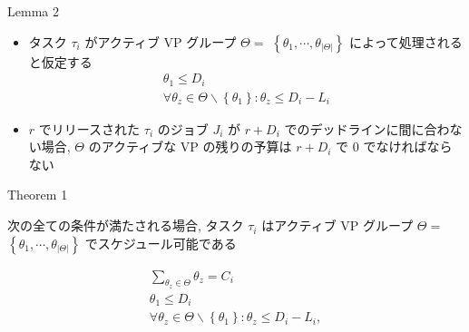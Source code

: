 \begin{frame}[label=lemma2]{Lemma 2}
    \begin{lemma}[]
        \begin{itemize}
            \item タスク $\tau_{i}$ がアクティブ VP グループ $\Theta=$  $\left\{\theta_{1}, \cdots, \theta_{|\Theta|}\right\}$ によって処理されると仮定する
                  \begin{equation*}
                      \begin{gathered}
                          \theta_{1} \leq D_{i} \\
                          \forall \theta_{z} \in \Theta \backslash\left\{\theta_{1}\right\}: \theta_{z} \leq D_{i}-L_{i}
                      \end{gathered}
                  \end{equation*}
            \item $r$ でリリースされた $\tau_{i}$ のジョブ $J_{i}$ が $r+D_{i}$ でのデッドラインに間に合わない場合, $\Theta$ のアクティブな VP の残りの予算は $r+D_{i}$ で 0 でなければならない
        \end{itemize}
    \end{lemma}
\end{frame}

\begin{frame}[label=theorem1]{Theorem 1}
    \begin{theorem}[]
        次の全ての条件が満たされる場合, タスク $\tau_{i}$ はアクティブ VP グループ $\Theta=$  $\left\{\theta_{1}, \cdots, \theta_{|\Theta|}\right\}$ でスケジュール可能である

        \begin{equation*}
            \begin{gathered}
                \sum_{\theta_{z} \in \Theta} \theta_{z}=C_{i} \\
                \theta_{1} \leq D_{i} \\
                \forall \theta_{z} \in \Theta \backslash\left\{\theta_{1}\right\}: \theta_{z} \leq D_{i}-L_{i},
            \end{gathered}
        \end{equation*}
    \end{theorem}
\end{frame}
